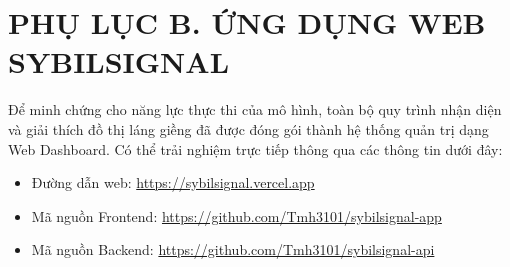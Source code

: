 \chapter{PHỤ LỤC B. ỨNG DỤNG WEB SYBILSIGNAL}

\indent\indent Để minh chứng cho năng lực thực thi của mô hình, toàn bộ quy trình nhận diện và giải thích đồ thị láng giềng đã được đóng gói thành hệ thống quản trị dạng Web Dashboard. Có thể trải nghiệm trực tiếp thông qua các thông tin dưới đây:

\begin{itemize}[label={--}, itemsep=1pt]
    \item Đường dẫn web: \url{https://sybilsignal.vercel.app}

    \item Mã nguồn Frontend: \url{https://github.com/Tmh3101/sybilsignal-app}

    \item Mã nguồn Backend: \url{https://github.com/Tmh3101/sybilsignal-api}
\end{itemize}